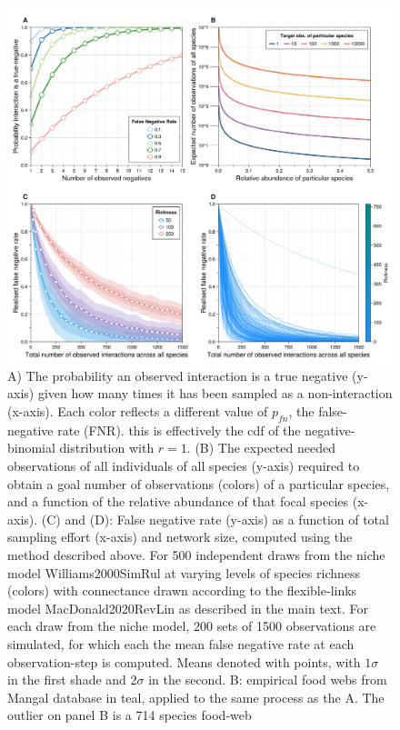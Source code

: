 \documentclass[11pt]{article}
\makeatletter
\def\maxwidth{\ifdim\Gin@nat@width>\linewidth\linewidth
\else\Gin@nat@width\fi}
\let\Oldincludegraphics\includegraphics
\renewcommand{\includegraphics}[1]{\Oldincludegraphics[width=\maxwidth]{#1}}
\makeatother
\begin{document}
\begin{figure}
\hypertarget{fig:fig1}{%
\centering
\includegraphics{./figures/fig1.png}
\caption{A) The probability an observed interaction is a true negative
(y-axis) given how many times it has been sampled as a non-interaction
(x-axis). Each color reflects a different value of \(p_{fn}\), the
false-negative rate (FNR). this is effectively the cdf of the
negative-binomial distribution with \(r=1\). (B) The expected needed
observations of all individuals of all species (y-axis) required to
obtain a goal number of observations (colors) of a particular species,
and a function of the relative abundance of that focal species (x-axis).
(C) and (D): False negative rate (y-axis) as a function of total
sampling effort (x-axis) and network size, computed using the method
described above. For 500 independent draws from the niche model
Williams2000SimRul at varying levels of species richness (colors) with
connectance drawn according to the flexible-links model
MacDonald2020RevLin as described in the main text. For each draw from
the niche model, 200 sets of 1500 observations are simulated, for which
each the mean false negative rate at each observation-step is computed.
Means denoted with points, with \(1\sigma\) in the first shade and
\(2\sigma\) in the second. B: empirical food webs from Mangal database
in teal, applied to the same process as the A. The outlier on panel B is
a 714 species food-web}\label{fig:fig1}
}
\end{figure}
\end{document}
